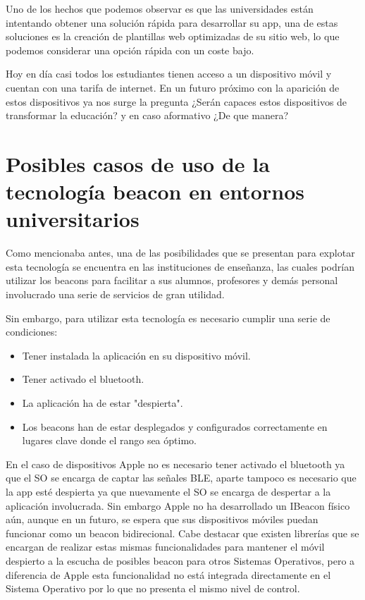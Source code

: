 Uno de los hechos que podemos observar es que las universidades están intentando obtener una solución rápida para desarrollar su app, una de estas soluciones es la creación de plantillas web optimizadas de su sitio web, lo que podemos considerar una opción rápida con un coste bajo.


Hoy en día casi todos los estudiantes tienen acceso a un dispositivo móvil y cuentan con una tarifa de internet. En un futuro próximo con la aparición de estos dispositivos ya nos surge la pregunta ¿Serán capaces estos dispositivos de transformar la educación? y en caso aformativo ¿De que manera? 

\section {Posibles casos de uso de la tecnología beacon en entornos universitarios}

Como mencionaba antes, una de las posibilidades que se presentan para explotar esta tecnología se encuentra en las instituciones de enseñanza, las cuales podrían utilizar los beacons para facilitar a sus alumnos, profesores y demás personal involucrado  una serie de servicios de gran utilidad.


Sin embargo, para utilizar esta tecnología es necesario cumplir una serie de condiciones:

\begin{itemize}
\item Tener instalada la aplicación en su dispositivo móvil.
\item Tener activado el bluetooth.
\item La aplicación ha de estar "despierta".
\item Los beacons han de estar desplegados y configurados correctamente en lugares clave donde el rango sea óptimo.
\end{itemize}

En el caso de dispositivos Apple no es necesario tener activado el bluetooth ya que el SO se encarga de captar las señales BLE, aparte tampoco es necesario que la app esté despierta ya que nuevamente el SO se encarga de despertar a la aplicación involucrada. Sin embargo Apple no ha desarrollado un IBeacon físico aún, aunque en un futuro, se espera que sus dispositivos móviles puedan funcionar como un beacon bidirecional. Cabe destacar que existen librerías que se encargan de realizar estas mismas funcionalidades para mantener el móvil despierto a la escucha de posibles beacon para otros Sistemas Operativos, pero a diferencia de Apple esta funcionalidad no está integrada directamente en el Sistema Operativo por lo que no presenta el mismo nivel de control.



